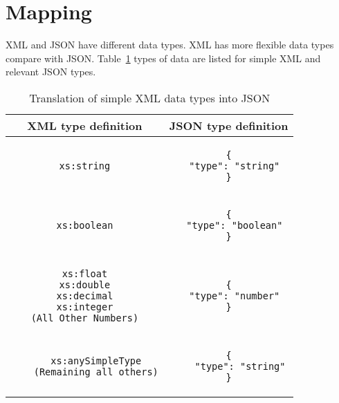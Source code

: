 \section{Mapping}
XML and JSON have different data types. XML has more flexible data types compare with JSON. Table~\ref{tbl:xml-json:types} types of data are listed for simple XML and relevant JSON types.
\begin{longtable}[hbtp]{c|c}
\caption{Translation of simple XML data types into JSON}
\label{tbl:xml-json:types}\\

\textbf{XML type definition} & \textbf{JSON type definition}\\
\hline

\begin{minipage}{.4\textwidth}
  \begin{lstlisting}
xs:string
  \end{lstlisting}
\end{minipage} &
\begin{minipage}{.4\textwidth}
\begin{lstlisting}
{
  "type": "string"
}
\end{lstlisting}
\end{minipage}\\

\hline
\begin{minipage}{.4\textwidth}
  \begin{lstlisting}
xs:boolean
  \end{lstlisting}
\end{minipage} &
\begin{minipage}{.4\textwidth}
\begin{lstlisting}
{
  "type": "boolean"
}
\end{lstlisting}
\end{minipage}\\

\hline
\begin{minipage}{.4\textwidth}
  \begin{lstlisting}
xs:float
xs:double
xs:decimal
xs:integer
(All Other Numbers)
  \end{lstlisting}
\end{minipage} &
\begin{minipage}{.4\textwidth}
\begin{lstlisting}
{
  "type": "number"
}
\end{lstlisting}
\end{minipage}\\
\hline

\begin{minipage}{.4\textwidth}
	\begin{lstlisting}
	xs:anySimpleType
	(Remaining all others)
	\end{lstlisting}
\end{minipage} &
\begin{minipage}{.4\textwidth}
\begin{lstlisting}
{
	"type": "string"
}
\end{lstlisting}
\end{minipage}\\
\end{longtable}


